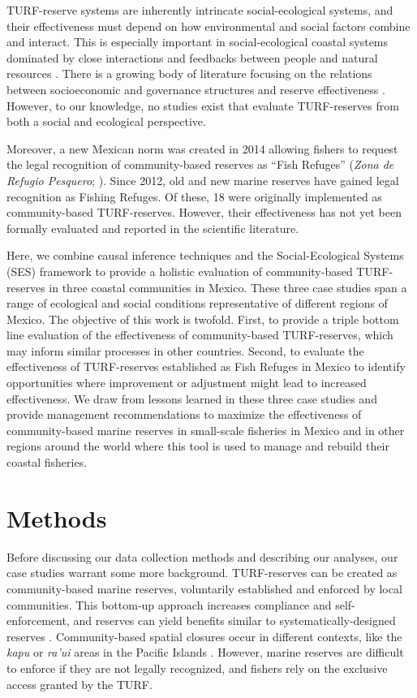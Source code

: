 \documentclass{frontiersSCNS}
\begin{document}
TURF-reserve systems are inherently intrincate social-ecological
systems, and their effectiveness must depend on how environmental and
social factors combine and interact. This is especially important in
social-ecological coastal systems dominated by close interactions and
feedbacks between people and natural resources \citep{ostrom_2009-hg}.
There is a growing body of literature focusing on the relations between
socioeconomic and governance structures and reserve effectiveness
\citep{halpern_2013,lpezangarita_2014,mascia_2017-m_,bergseth_2018}.
However, to our knowledge, no studies exist that evaluate TURF-reserves
from both a social and ecological perspective.

Moreover, a new Mexican norm was created in 2014 allowing fishers to
request the legal recognition of community-based reserves as ``Fish
Refuges'' (\emph{Zona de Refugio Pesquero}; \citet{nom}). Since 2012,
old and new marine reserves have gained legal recognition as Fishing
Refuges. Of these, 18 were originally implemented as community-based
TURF-reserves. However, their effectiveness has not yet been formally
evaluated and reported in the scientific literature.

Here, we combine causal inference techniques and the Social-Ecological
Systems (SES) framework to provide a holistic evaluation of
community-based TURF-reserves in three coastal communities in Mexico.
These three case studies span a range of ecological and social
conditions representative of different regions of Mexico. The objective
of this work is twofold. First, to provide a triple bottom line
evaluation of the effectiveness of community-based TURF-reserves, which
may inform similar processes in other countries. Second, to evaluate the
effectiveness of TURF-reserves established as Fish Refuges in Mexico to
identify opportunities where improvement or adjustment might lead to
increased effectiveness. We draw from lessons learned in these three
case studies and provide management recommendations to maximize the
effectiveness of community-based marine reserves in small-scale
fisheries in Mexico and in other regions around the world where this
tool is used to manage and rebuild their coastal fisheries.

\hypertarget{methods}{%
\section{Methods}\label{methods}}

Before discussing our data collection methods and describing our
analyses, our case studies warrant some more background. TURF-reserves
can be created as community-based marine reserves, voluntarily
established and enforced by local communities. This bottom-up approach
increases compliance and self-enforcement, and reserves can yield
benefits similar to systematically-designed reserves
\citep{gelcich_2015,beger_2004,smallhornwest_2018}. Community-based
spatial closures occur in different contexts, like the \emph{kapu} or
\emph{ra'ui} areas in the Pacific Islands
\citep{bohnsack_2004,johannes_2002}. However, marine reserves are
difficult to enforce if they are not legally recognized, and fishers
rely on the exclusive access granted by the TURF.
\end{document}
